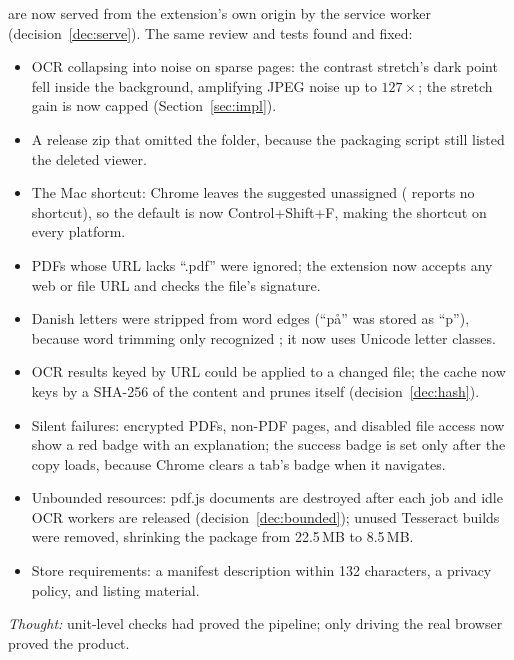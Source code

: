 \begin{description}[leftmargin=1.4em, style=nextline, itemsep=4pt]
        are now served from the extension's own origin by the service worker
        (decision~\ref{dec:serve}). The same review and tests found and fixed:
        \begin{itemize}[nosep]
          \item OCR collapsing into noise on sparse pages: the contrast stretch's
                dark point fell inside the background, amplifying JPEG noise up
                to $127\times$; the stretch gain is now capped
                (Section~\ref{sec:impl}).
          \item A release zip that omitted the  folder, because
                the packaging script still listed the deleted viewer.
          \item The Mac shortcut: Chrome leaves the suggested 
                unassigned ( reports no shortcut),
                so the default is now Control+Shift+F, making the shortcut
                 on every platform.
          \item PDFs whose URL lacks ``.pdf'' were ignored; the extension now
                accepts any web or file URL and checks the file's 
                signature.
          \item Danish letters were stripped from word edges (``på'' was stored
                as ``p''), because word trimming only recognized ; it
                now uses Unicode letter classes.
          \item OCR results keyed by URL could be applied to a changed file; the
                cache now keys by a SHA-256 of the content and prunes itself
                (decision~\ref{dec:hash}).
          \item Silent failures: encrypted PDFs, non-PDF pages, and disabled file
                access now show a red badge with an explanation; the success
                badge is set only after the copy loads, because Chrome clears a
                tab's badge when it navigates.
          \item Unbounded resources: pdf.js documents are destroyed after each
                job and idle OCR workers are released
                (decision~\ref{dec:bounded}); unused Tesseract builds were
                removed, shrinking the package from 22.5\,MB to 8.5\,MB.
          \item Store requirements: a manifest description within 132 characters,
                a privacy policy, and listing material.
        \end{itemize}
        \emph{Thought:} unit-level checks had proved the pipeline; only driving
        the real browser proved the product.
\end{description}

